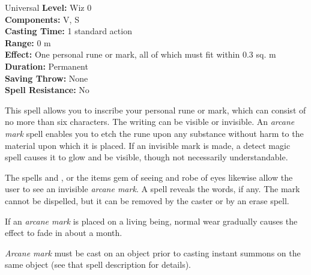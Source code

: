 {Universal}
{
	\textbf{Level:}
	Wiz 0\\
	\textbf{Components:}
	V, S\\
	\textbf{Casting Time:}
	1 standard action\\
	\textbf{Range:}
	0 m\\
	\textbf{Effect:}
	One personal rune or mark, all of which must fit within 0.3 sq. m\\
	\textbf{Duration:}
	Permanent\\
	\textbf{Saving Throw:}
	None\\
	\textbf{Spell Resistance:}
	No\\
}
{
	This spell allows you to inscribe your personal rune or mark, which can consist of no more than six characters. The writing can be visible or invisible. An \emph{arcane mark} spell enables you to etch the rune upon any substance without harm to the material upon which it is placed. If an invisible mark is made, a detect magic spell causes it to glow and be visible, though not necessarily understandable.

	The spells  and , or the items gem of seeing and robe of eyes likewise allow the user to see an invisible \emph{arcane mark}. A  spell reveals the words, if any. The mark cannot be dispelled, but it can be removed by the caster or by an erase spell.

	If an \emph{arcane mark} is placed on a living being, normal wear gradually causes the effect to fade in about a month.

	\emph{Arcane mark} must be cast on an object prior to casting instant summons on the same object (see that spell description for details).

}
